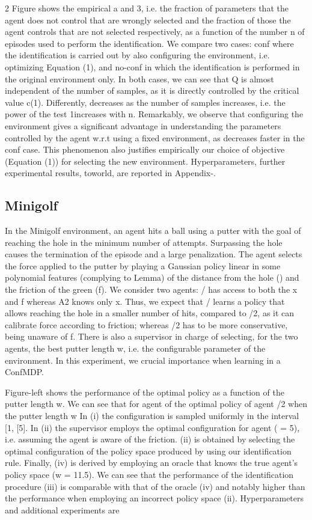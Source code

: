 \documentclass{article}
\begin{document}
\begin{paracol}{2}
Figure shows the empirical a and 3, i.e. the fraction of
parameters that the agent does not control that are wrongly
selected and the fraction of those the agent controls that are
not selected respectively, as a function of the number n of
episodes used to perform the identification. We compare two
cases: conf where the identification is carried out by also
configuring the environment, i.e. optimizing Equation (1),
and no-conf in which the identification is performed in the
original environment only. In both cases, we can see that
Q is almost independent of the number of samples, as it is
directly controlled by the critical value c(1). Differently, 
decreases as the number of samples increases, i.e. the power
of the test 1increases with n. Remarkably, we observe
that configuring the environment gives a significant advantage in understanding the parameters controlled by the agent
w.r.t using a fixed environment, as  decreases faster in the
conf case. This phenomenon also justifies empirically our
choice of objective (Equation (1)) for selecting the new environment. Hyperparameters, further experimental results, toworld, are reported in Appendix-.


\subsection*{Minigolf}


In the Minigolf environment, an agent hits a ball using a putter with the goal of reaching the hole in the minimum number of attempts. Surpassing the hole causes the termination
of the episode and a large penalization. The agent selects the
force applied to the putter by playing a Gaussian policy linear in some polynomial features (complying to Lemma) of
the distance from the hole () and the friction of the green
(f). We consider two agents: / has access to both the x and
f whereas A2 knows only x. Thus, we expect that / learns
a policy that allows reaching the hole in a smaller number of
hits, compared to /2, as it can calibrate force according to
friction; whereas /2 has to be more conservative, being unaware of f. There is also a supervisor in charge of selecting,
for the two agents, the best putter length w, i.e. the configurable parameter of the environment. In this experiment, we
crucial importance when learning in a ConfMDP.


Figure-left shows the performance of the optimal policy
as a function of the putter length w. We can see that for agent
of the optimal policy of agent /2 when the putter length w
In (i) the configuration is sampled uniformly in the interval
[1, [5]. In (ii) the supervisor employs the optimal configuration for agent  ( = 5), i.e. assuming the agent is aware
of the friction. (ii) is obtained by selecting the optimal configuration of the policy space produced by using our identification rule. Finally, (iv) is derived by employing an oracle
that knows the true agent's policy space (w = 11.5). We can
see that the performance of the identification procedure (iii)
is comparable with that of the oracle (iv) and notably higher
than the performance when employing an incorrect policy
space (ii). Hyperparameters and additional experiments are

\end{paracol}
\end{document}
